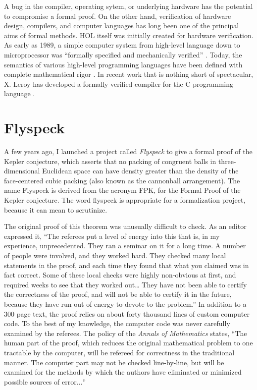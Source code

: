 \documentclass{llncs}
\begin{document}
A bug in the compiler, operating sytem,
or underlying hardware has the potential to compromise a formal proof. 
On the other hand, verification of hardware design, 
compilers, and computer
languages has long been one of the principal aims of formal methods.
HOL itself was initially created for hardware verification.
As early as 1989, a simple computer system from high-level language down to microprocessor was ``formally specified and mechanically
verified'' \cite{BHMY}.
Today, the semantics of various
high-level programming languages have been defined with complete mathematical
rigor \cite{Harper}.  
In recent work that is nothing short of spectacular, X. Leroy has
developed a formally verified compiler for the C programming
language
\cite{CC}.


\section{Flyspeck}

A few years ago, I launched a project called {\it Flyspeck} to
give a formal proof of the Kepler conjecture, which asserts that
no packing of congruent balls in three-dimensional Euclidean space
can have density greater than the density of the face-centered cubic
packing (also known as the cannonball arrangement).  The name
Flyspeck is derived from the acronym FPK, for the Formal Proof of the Kepler
conjecture.  The word flyspeck is 
 appropriate for a formalization project, because it 
can mean to scrutinize.

The original proof of this theorem was unusually difficult
to check.  As an editor expressed it, ``The referees put a level of energy into this that is, in my experience, unprecedented. They ran a seminar on it for a long time. A number of people were involved, and they worked hard. They checked many local statements in the proof, and each time they found that what you claimed was in fact correct. Some of these local checks were highly non-obvious at first, and required weeks to see that they worked out\ldots
They have not been able to certify the correctness of the proof, 
and will not be able to certify it in the future, because they 
have run out of energy to devote to the problem.''  In addition to
a $300$ page text, the proof relies
on about forty thousand lines of custom computer code.  To the best of my knowledge,
the computer code was
never carefully examined by the referees.
The policy of the {\it Annals of Mathematics}
states, ``The human part of the proof, which reduces the original mathematical problem to one tractable by the computer, will be refereed for correctness in the traditional manner. The computer part may not be checked line-by-line, but will be examined for the methods by which the authors have eliminated or minimized possible sources of error$\ldots$''
\end{document}

